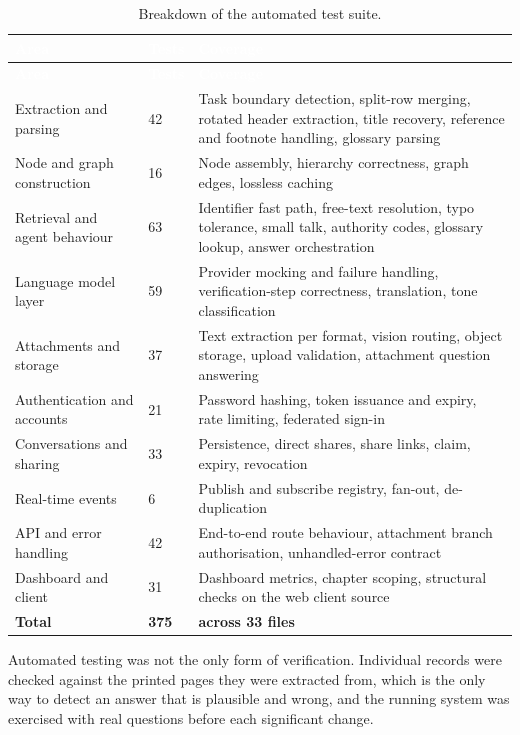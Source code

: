 \begin{longtable}{|p{}|p{}|p{}|}
\caption{Breakdown of the automated test suite.}\label{tab:tests}\\
\hline
\rowcolor{myblue}\textcolor{white}{\textbf{Area}} & \textcolor{white}{\textbf{Tests}} & \textcolor{white}{\textbf{Coverage}} \\
\hline
\endfirsthead
\hline
\rowcolor{myblue}\textcolor{white}{\textbf{Area}} & \textcolor{white}{\textbf{Tests}} & \textcolor{white}{\textbf{Coverage}} \\
\hline
\endhead
Extraction and parsing & 42 & Task boundary detection, split-row merging, rotated header extraction, title recovery, reference and footnote handling, glossary parsing \\ \hline
Node and graph construction & 16 & Node assembly, hierarchy correctness, graph edges, lossless caching \\ \hline
Retrieval and agent behaviour & 63 & Identifier fast path, free-text resolution, typo tolerance, small talk, authority codes, glossary lookup, answer orchestration \\ \hline
Language model layer & 59 & Provider mocking and failure handling, verification-step correctness, translation, tone classification \\ \hline
Attachments and storage & 37 & Text extraction per format, vision routing, object storage, upload validation, attachment question answering \\ \hline
Authentication and accounts & 21 & Password hashing, token issuance and expiry, rate limiting, federated sign-in \\ \hline
Conversations and sharing & 33 & Persistence, direct shares, share links, claim, expiry, revocation \\ \hline
Real-time events & 6 & Publish and subscribe registry, fan-out, de-duplication \\ \hline
API and error handling & 42 & End-to-end route behaviour, attachment branch authorisation, unhandled-error contract \\ \hline
Dashboard and client & 31 & Dashboard metrics, chapter scoping, structural checks on the web client source \\ \hline
\textbf{Total} & \textbf{375} & \textbf{across 33 files} \\ \hline
\end{longtable}

Automated testing was not the only form of verification. Individual records were checked
against the printed pages they were extracted from, which is the only way to detect an
answer that is plausible and wrong, and the running system was exercised with real
questions before each significant change.

